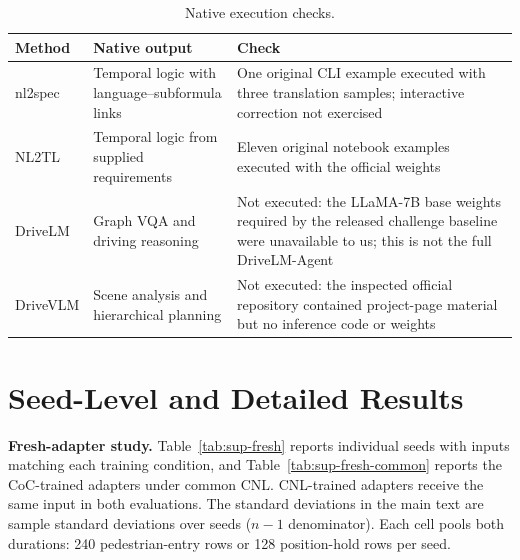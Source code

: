 \documentclass[10pt]{article}
\begin{document}
\begin{table}[h]
\centering\small
\caption{Native execution checks.}\label{tab:sup-native}
\begin{tabularx}{\textwidth}{@{}>{\raggedright\arraybackslash}p{}>{\raggedright\arraybackslash}p{}>{\raggedright\arraybackslash}X@{}}
\toprule
Method & Native output & Check\\
\midrule
nl2spec & Temporal logic with language--subformula links & One original CLI example executed with three translation samples; interactive correction not exercised\\[2pt]
NL2TL & Temporal logic from supplied requirements & Eleven original notebook examples executed with the official weights\\[2pt]
DriveLM & Graph VQA and driving reasoning & Not executed: the LLaMA-7B base weights required by the released challenge baseline were unavailable to us; this is not the full DriveLM-Agent\\[2pt]
DriveVLM & Scene analysis and hierarchical planning & Not executed: the inspected official repository contained project-page material but no inference code or weights\\
\bottomrule
\end{tabularx}
\end{table}

\section{Seed-Level and Detailed Results}\label{sup:seeds}

\textbf{Fresh-adapter study.} Table~\ref{tab:sup-fresh} reports individual seeds
with inputs matching each training condition, and Table~\ref{tab:sup-fresh-common}
reports the CoC-trained adapters under common CNL. CNL-trained adapters receive
the same input in both evaluations. The standard deviations in the main text are
sample standard deviations over seeds ($n-1$ denominator). Each cell pools both
durations: 240 pedestrian-entry rows or 128 position-hold rows per seed.
\end{document}
